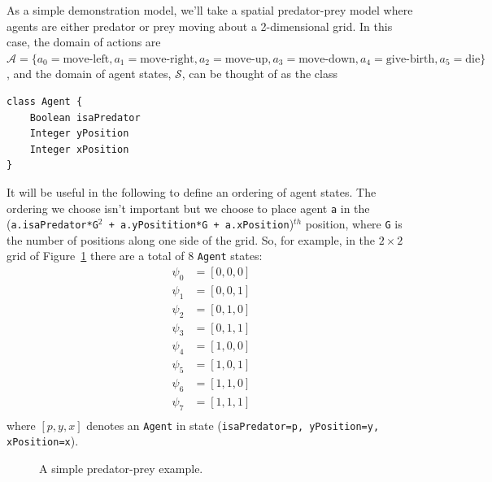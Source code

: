 \documentclass{article}
\begin{document}
As a simple demonstration model, we'll take a spatial predator-prey model where agents are either predator or prey moving about a 2-dimensional grid. In this case, the domain of actions are $\mathcal{A} = \{ a_0=\textrm{move-left}, a_1=\textrm{move-right}, a_2=\textrm{move-up}, a_3=\textrm{move-down}, a_4=\textrm{give-birth}, a_5=\textrm{die}\}$, and the domain of agent states, $\mathcal{S}$, can be thought of as the class 
\begin{lstlisting}
class Agent {
	Boolean	isaPredator
	Integer	yPosition
	Integer	xPosition
}
\end{lstlisting}

It will be useful in the following to define an ordering of agent states. The ordering we choose isn't important but we choose to place agent \texttt{a} in the (\texttt{a.isaPredator*G$^2$ + a.yPositition*G + a.xPosition})$^{th}$ position, where \texttt{G} is the number of positions along one side of the grid. So, for example, in the $2\times 2$ grid of Figure~\ref{fig:AB-MCMC-1} there are a total of 8 \texttt{Agent} states:
\begin{align*}
\psi_0 &= [0, 0, 0] \\
\psi_1 &= [0, 0, 1] \\
\psi_2 &= [0, 1, 0] \\
\psi_3 &= [0, 1, 1] \\
\psi_4 &= [1, 0, 0] \\
\psi_5 &= [1, 0, 1] \\
\psi_6 &= [1, 1, 0] \\
\psi_7 &= [1, 1, 1]  \\
\end{align*}
where $[p,y,x]$ denotes an \texttt{Agent} in state (\texttt{isaPredator=p, yPosition=y, xPosition=x}).

\begin{figure}
	\centering
	\caption{A simple predator-prey example.\label{fig:AB-MCMC-1}}
\end{figure}
\end{document}

